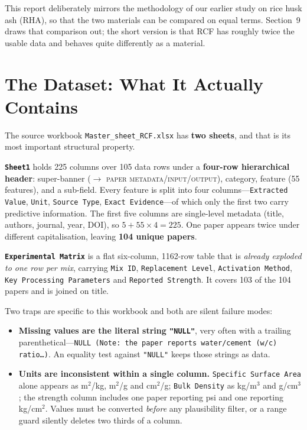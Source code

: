 \documentclass[11pt]{article}
\begin{document}
This report deliberately mirrors the methodology of our earlier study on rice husk
ash (RHA), so that the two materials can be compared on equal terms. Section~9
draws that comparison out; the short version is that RCF has roughly twice the
usable data and behaves quite differently as a material.

\section{The Dataset: What It Actually Contains}
The source workbook \texttt{Master\_sheet\_RCF.xlsx} has \textbf{two sheets}, and
that is its most important structural property.

\textbf{\texttt{Sheet1}} holds 225 columns over 105 data rows under a
\textbf{four-row hierarchical header}: super-banner ($\rightarrow$ \textsc{paper
metadata}/\textsc{input}/\textsc{output}), category, feature (55 features), and a
sub-field. Every feature is split into four columns---\texttt{Extracted Value},
\texttt{Unit}, \texttt{Source Type}, \texttt{Exact Evidence}---of which only the
first two carry predictive information. The first five columns are single-level
metadata (title, authors, journal, year, DOI), so $5 + 55\times4 = 225$. One paper
appears twice under different capitalisation, leaving \textbf{104 unique papers}.

\textbf{\texttt{Experimental Matrix}} is a flat six-column, 1162-row table that is
\emph{already exploded to one row per mix}, carrying \texttt{Mix ID},
\texttt{Replacement Level}, \texttt{Activation Method}, \texttt{Key Processing
Parameters} and \texttt{Reported Strength}. It covers 103 of the 104 papers and is
joined on title.

Two traps are specific to this workbook and both are silent failure modes:

\begin{itemize}\itemsep2pt
  \item \textbf{Missing values are the literal string \texttt{"NULL"}}, very often
        with a trailing parenthetical---\texttt{NULL (Note: the paper reports
        water/cement (w/c) ratio\dots)}. An equality test against \texttt{"NULL"}
        keeps those strings as data.
  \item \textbf{Units are inconsistent within a single column.} \texttt{Specific
        Surface Area} alone appears as m$^2$/kg, m$^2$/g and cm$^2$/g;
        \texttt{Bulk Density} as kg/m$^3$ and g/cm$^3$; the strength column
        includes one paper reporting psi and one reporting kg/cm$^2$. Values must
        be converted \emph{before} any plausibility filter, or a range guard
        silently deletes two thirds of a column.
\end{itemize}
\end{document}
